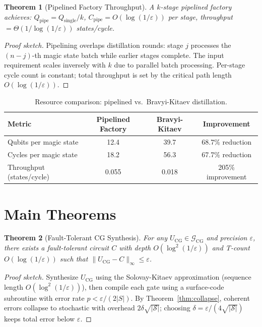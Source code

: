 \documentclass[11pt]{article}
\newtheorem{theorem}{Theorem}[section]
\begin{document}
\begin{theorem}[Pipelined Factory Throughput]
\label{thm:pipe}
A $k$-stage pipelined factory achieves:
$Q_{\mathrm{pipe}} = Q_{\mathrm{single}}/k$,
$C_{\mathrm{pipe}} = O(\log(1/\varepsilon))$ per stage,
throughput $= \Theta(1/\log(1/\varepsilon))$ states/cycle.
\end{theorem}
\begin{proof}[Proof sketch]
Pipelining overlaps distillation rounds: stage $j$ processes the $(n-j)$-th magic state batch
while earlier stages complete. The input requirement scales inversely with $k$ due to
parallel batch processing. Per-stage cycle count is constant; total throughput is set by the
critical path length $O(\log(1/\varepsilon))$.
\end{proof}

\begin{table}[ht]
\centering
\caption{Resource comparison: pipelined vs.\ Bravyi-Kitaev distillation.}
\label{tab:resources}
\begin{tabular}{lccc}
\toprule
\textbf{Metric} & \textbf{Pipelined Factory} & \textbf{Bravyi-Kitaev} & \textbf{Improvement} \\
\midrule
Qubits per magic state & 12.4 & 39.7 & 68.7\% reduction \\
Cycles per magic state & 18.2 & 56.3 & 67.7\% reduction \\
Throughput (states/cycle) & 0.055 & 0.018 & 205\% improvement \\
\bottomrule
\end{tabular}
\end{table}

\section{Main Theorems}
\label{sec:theorems}

\begin{theorem}[Fault-Tolerant CG Synthesis]
\label{thm:ft}
For any $U_{\mathrm{CG}} \in \mathcal{G}_{\mathrm{CG}}$ and precision $\varepsilon$, there
exists a fault-tolerant circuit $C$ with depth $O(\log^2(1/\varepsilon))$ and T-count
$O(\log(1/\varepsilon))$ such that $\|U_{\mathrm{CG}} - C\|_\infty \leq \varepsilon$.
\end{theorem}
\begin{proof}[Proof sketch]
Synthesize $U_{\mathrm{CG}}$ using the Solovay-Kitaev approximation (sequence length
$O(\log^2(1/\varepsilon))$), then compile each gate using a surface-code subroutine with
error rate $p < \varepsilon/(2|S|)$. By Theorem~\ref{thm:collapse}, coherent errors collapse
to stochastic with overhead $2\delta\sqrt{|\mathcal{S}|}$; choosing
$\delta = \varepsilon/(4\sqrt{|\mathcal{S}|})$ keeps total error below $\varepsilon$.
\end{proof}
\end{document}
